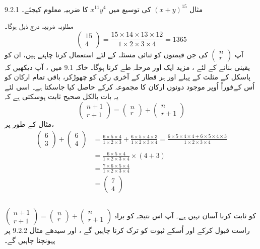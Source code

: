 9.2.1
 مثال 
 \( (x+y)^{15}\)
کی توسیع میں
    \(x^{11}y^{4}\)
کا ضربیہ معلوم کیجئے۔ 

مطلوبہ ضربیہ درج ذیل ہوگا۔
  \[\begin{pmatrix}
    15\\4
     \end{pmatrix}
    =\frac{15\times14\times13\times12}{1\times2\times3\times4}=1365\]  
آپ
    \(\begin{pmatrix}
     n\\r
     \end{pmatrix}\)
  کی جن قیمتوں کو ثنائی مسئلہ کے لئے استعمال کرنا چاہتے ہیں، ان کو یقینی بنانے کے لئے ،    مزید ایک اور مرحلہ طے کرنا ہوگا۔   خاکہ  
  9.1
  میں ،  آپ دیکھیں کہ پاسکل کے مثلث کے  پہلے اور ہر قطار کے آخری رکن کو چھوڑکر،   باقی تمام ارکان کو اُس کےفوراً    اُوپر موجود دونوں ارکان کا مجموعہ کرکے حاصل کیا جاسکتا ہے۔ اسی لئے یہ بات بالکل صحیح  ثابت  ہوسکتی ہے کہ 
   \[    \begin{pmatrix}
     n+1\\r+1
     \end{pmatrix}
     =
     \begin{pmatrix}
     n\\r
     \end{pmatrix}
     +
     \begin{pmatrix}
    n\\r+1
     \end{pmatrix}\]
  مثال کے طور پر،
\begin{align*}
\begin{pmatrix}6\\3\end{pmatrix}+\begin{pmatrix}6\\4\end{pmatrix}&=\frac{6\times5\times4}{1\times2\times3}+\frac{6\times5\times4\times3}{1\times2\times3\times4}=\frac{6\times5\times4\times4+6\times5\times4\times3}{1\times2\times3\times4}\\
&=\frac{6\times5\times4}{1\times2\times3\times4}\times(4+3)\\
&=\frac{7\times6\times5\times4}{1\times2\times3\times4}\\
&=\begin{pmatrix}7\\4\end{pmatrix}\\
\end{align*}
  \\
  \(  \begin{pmatrix}
     n+1\\r+1
     \end{pmatrix}
     =
     \begin{pmatrix}
    n\\r
     \end{pmatrix}
     +
     \begin{pmatrix}
     n\\r+1
     \end{pmatrix}\)
کو  ثابت کرنا آسان نہیں ہے۔  آپ اس نتیجہ کو براہ راست قبول کرکے اور اُسکے ثبوت کو ترک کرنا چاہیں گے ،  اور سیدھے مثال 
9.2.2
  پر پہونچنا چاہیں گے۔  

